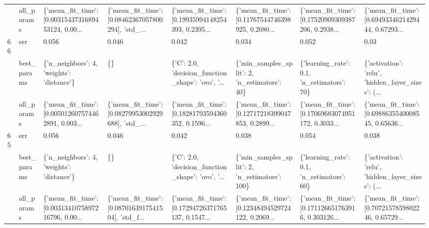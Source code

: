 \begin{tabular}{llllllll}
   & all\_params &  \{'mean\_fit\_time': [0.0031543731689453124, 0.00... &  \{'mean\_fit\_time': [0.08462367057800294], 'std\_... &  \{'mean\_fit\_time': [0.19935994148254393, 0.2395... &  \{'mean\_fit\_time': [0.11767544746398925, 0.2080... &  \{'mean\_fit\_time': [0.17520909309387206, 0.2938... &  \{'mean\_fit\_time': [0.6949334621429444, 0.67293... \\
66 & err &                                              0.056 &                                              0.046 &                                              0.042 &                                              0.034 &                                              0.052 &                                               0.03 \\
   & best\_params &          \{'n\_neighbors': 4, 'weights': 'distance'\} &                                                 \{\} &  \{'C': 2.0, 'decision\_function\_shape': 'ovo', '... &       \{'min\_samples\_split': 2, 'n\_estimators': 40\} &         \{'learning\_rate': 0.1, 'n\_estimators': 70\} &  \{'activation': 'relu', 'hidden\_layer\_sizes': (... \\
   & all\_params &  \{'mean\_fit\_time': [0.005012607574462891, 0.003... &  \{'mean\_fit\_time': [0.08279953002929688], 'std\_... &  \{'mean\_fit\_time': [0.18281793594360352, 0.1596... &  \{'mean\_fit\_time': [0.12717218399047853, 0.2899... &  \{'mean\_fit\_time': [0.17069683074951172, 0.3033... &  \{'mean\_fit\_time': [0.6988635540008545, 0.65636... \\
65 & err &                                              0.056 &                                              0.046 &                                              0.042 &                                              0.038 &                                              0.054 &                                              0.038 \\
   & best\_params &          \{'n\_neighbors': 4, 'weights': 'distance'\} &                                                 \{\} &  \{'C': 2.0, 'decision\_function\_shape': 'ovo', '... &      \{'min\_samples\_split': 2, 'n\_estimators': 100\} &         \{'learning\_rate': 0.1, 'n\_estimators': 60\} &  \{'activation': 'relu', 'hidden\_layer\_sizes': (... \\
   & all\_params &  \{'mean\_fit\_time': [0.0031341075897216796, 0.00... &  \{'mean\_fit\_time': [0.0870163917541504], 'std\_f... &  \{'mean\_fit\_time': [0.17294726371765137, 0.1547... &  \{'mean\_fit\_time': [0.12348494529724122, 0.2069... &  \{'mean\_fit\_time': [0.171126651763916, 0.303126... &  \{'mean\_fit\_time': [0.7072157859802246, 0.65729... \\

\end{tabular}
